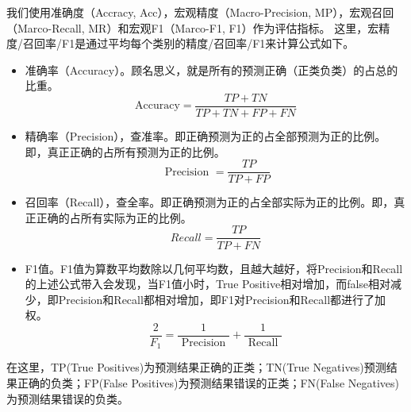 我们使用准确度（Accracy, Acc），宏观精度（Macro-Precision, MP），宏观召回（Marco-Recall, MR）和宏观F1（Marco-F1, F1）作为评估指标。 这里，宏精度/召回率/F1是通过平均每个类别的精度/召回率/F1来计算公式如下。
\begin{itemize}
	\item 准确率（Accuracy）。顾名思义，就是所有的预测正确（正类负类）的占总的比重。
		\begin{equation}
			\text {Accuracy}=\frac{TP+TN}{TP+TN+FP+FN}
		\end{equation}
	\item 精确率（Precision），查准率。即正确预测为正的占全部预测为正的比例。即，真正正确的占所有预测为正的比例。
		\begin{equation}
			\text { Precision }=\frac{TP}{TP+FP}
		\end{equation}
	\item 召回率（Recall），查全率。即正确预测为正的占全部实际为正的比例。即，真正正确的占所有实际为正的比例。
		\begin{equation}
			Recall=\frac{TP}{TP+FN}
		\end{equation}
	\item F1值。F1值为算数平均数除以几何平均数，且越大越好，将Precision和Recall的上述公式带入会发现，当F1值小时，True Positive相对增加，而false相对减少，即Precision和Recall都相对增加，即F1对Precision和Recall都进行了加权。
		\begin{equation}
			\frac{2}{F_{1}}=\frac{1}{\text { Precision }}+\frac{1}{\text { Recall }}
		\end{equation}
\end{itemize}

在这里，TP(True Positives)为预测结果正确的正类；TN(True Negatives)预测结果正确的负类；FP(False Positives)为预测结果错误的正类；FN(False Negatives)为预测结果错误的负类。

